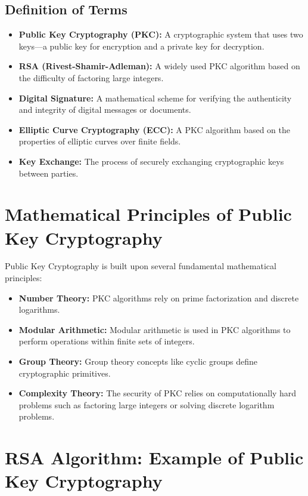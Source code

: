 \documentclass[12pt]{article}
\begin{document}
\subsection{Definition of Terms}
\begin{itemize}
    \item \textbf{Public Key Cryptography (PKC):} A cryptographic system that uses two keys—a public key for encryption and a private key for decryption.
    \item \textbf{RSA (Rivest-Shamir-Adleman):} A widely used PKC algorithm based on the difficulty of factoring large integers.
    \item \textbf{Digital Signature:} A mathematical scheme for verifying the authenticity and integrity of digital messages or documents.
    \item \textbf{Elliptic Curve Cryptography (ECC):} A PKC algorithm based on the properties of elliptic curves over finite fields.
    \item \textbf{Key Exchange:} The process of securely exchanging cryptographic keys between parties.
\end{itemize}

\newpage
\section{Mathematical Principles of Public Key Cryptography}
Public Key Cryptography is built upon several fundamental mathematical principles:
\begin{itemize}
    \item \textbf{Number Theory:} PKC algorithms rely on prime factorization and discrete logarithms.
    \item \textbf{Modular Arithmetic:} Modular arithmetic is used in PKC algorithms to perform operations within finite sets of integers.
    \item \textbf{Group Theory:} Group theory concepts like cyclic groups define cryptographic primitives.
    \item \textbf{Complexity Theory:} The security of PKC relies on computationally hard problems such as factoring large integers or solving discrete logarithm problems.
\end{itemize}

\newpage
\section{RSA Algorithm: Example of Public Key Cryptography}
\end{document}
